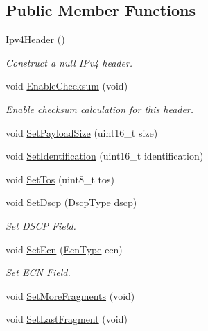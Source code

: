 \subsection*{Public Member Functions}
\begin{DoxyCompactItemize}
\item 
\hyperlink{classns3_1_1Ipv4Header_afc85b0214e6cd0eadd0eb2ef6b5950dd}{Ipv4\+Header} ()
\begin{DoxyCompactList}\small\item\em Construct a null I\+Pv4 header. \end{DoxyCompactList}\item 
void \hyperlink{classns3_1_1Ipv4Header_a93a16e6147989f0d772634c2abceb7d6}{Enable\+Checksum} (void)
\begin{DoxyCompactList}\small\item\em Enable checksum calculation for this header. \end{DoxyCompactList}\item 
void \hyperlink{classns3_1_1Ipv4Header_a3e961181f7839619a68bb7a2dcd483b0}{Set\+Payload\+Size} (uint16\+\_\+t size)
\item 
void \hyperlink{classns3_1_1Ipv4Header_ad49980212aa15a72535a265e4de8ad5e}{Set\+Identification} (uint16\+\_\+t identification)
\item 
void \hyperlink{classns3_1_1Ipv4Header_ae6e14fe2ebf6e1836cb13d1834ea15d2}{Set\+Tos} (uint8\+\_\+t tos)
\item 
void \hyperlink{classns3_1_1Ipv4Header_a8028ba47880c8d03fc64abf5554f373a}{Set\+Dscp} (\hyperlink{classns3_1_1Ipv4Header_aaa17802e7732a689311b72d48d1a3450}{Dscp\+Type} dscp)
\begin{DoxyCompactList}\small\item\em Set D\+S\+CP Field. \end{DoxyCompactList}\item 
void \hyperlink{classns3_1_1Ipv4Header_aa6c5c81b8de119c971e3bee0ffe62bf6}{Set\+Ecn} (\hyperlink{classns3_1_1Ipv4Header_a9cec46635fa719f0d58234cf8805991b}{Ecn\+Type} ecn)
\begin{DoxyCompactList}\small\item\em Set E\+CN Field. \end{DoxyCompactList}\item 
void \hyperlink{classns3_1_1Ipv4Header_a06f6947bb9e9d034be9588d9ec0bc8a6}{Set\+More\+Fragments} (void)
\item 
void \hyperlink{classns3_1_1Ipv4Header_a23cde0c3e605dae267aa62731fca2d9d}{Set\+Last\+Fragment} (void)
\item 

\end{DoxyCompactItemize}
